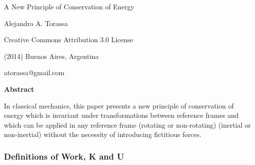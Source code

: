 \documentclass[10pt]{article}
\begin{document}
\begin{center}

{\Large A New Principle of Conservation of Energy}

\bigskip \medskip

Alejandro A. Torassa

\bigskip \medskip

\footnotesize

Creative Commons Attribution 3.0 License

(2014) Buenos Aires, Argentina

atorassa@gmail.com

\bigskip \smallskip

\small

{\bf Abstract}

\bigskip

\parbox{96mm}{In classical mechanics, this paper presents a new principle of conservation of energy which is invariant under transformations between reference frames and which can be applied in any reference frame (rotating or non-rotating) (inertial or non-inertial) without the necessity of introducing fictitious forces.}

\end{center}

\normalsize

\vspace{-0.60em}

{\centering\subsubsection*{Definitions of Work, K and U}}

\vspace{+0.90em}
\end{document}
